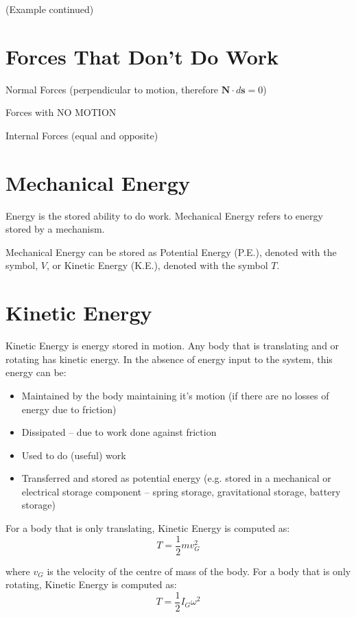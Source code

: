 \documentclass[12pt,letterpaper,twoside]{report}
\begin{document}
\newpage
(Example continued)
\newpage

\section{Forces That Don't Do Work}
Normal Forces (perpendicular to motion, therefore $\bm{N} \cdot d \bm{s}=0$)

\vspace*{5\baselineskip}

Forces with NO MOTION

\vspace*{5\baselineskip}

Internal Forces (equal and opposite)

\vspace*{5\baselineskip}

\section{Mechanical Energy}
Energy is the stored ability to do work.  Mechanical Energy refers to energy stored by a mechanism. 

Mechanical Energy can be stored as Potential Energy (P.E.), denoted with the symbol, $V$, or Kinetic Energy (K.E.), denoted with the symbol $T$.

\section{Kinetic Energy}
Kinetic Energy is energy stored in motion.  Any body that is translating and or rotating has kinetic energy.  In the absence of energy input to the system, this energy can be:
\begin{itemize}
\item Maintained by the body maintaining it’s motion (if there are no losses of energy due to friction)
\item Dissipated – due to work done against friction
\item Used to do (useful) work
\item Transferred and stored as potential energy (e.g. stored in a mechanical or electrical storage component – spring storage, gravitational storage, battery storage)
\end{itemize}

For a body that is only translating, Kinetic Energy is computed as:
\[
T = \frac{1}{2} m v_G^2
\]

where $v_G$ is the velocity of the centre of mass of the body.  For a body that is only rotating, Kinetic Energy is computed as:
\[
T = \frac{1}{2} I_G \omega^2
\]
\end{document}
